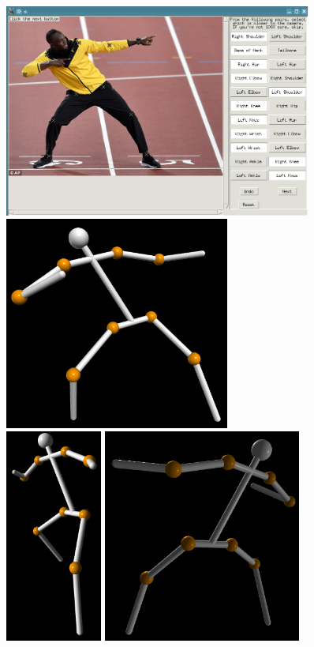 \documentclass[final]{article}
\begin{document}
\begin{spacing}{1.1}
\begin{figure}[h]
  \centering
  \includegraphics[height=7cm]{fig/boltgui.png}
  \includegraphics[height=7cm]{fig/boltrecons.png} \\
  \includegraphics[height=7cm]{fig/boltrecons2.png}
  \includegraphics[height=7cm]{fig/boltrecons3.png}

\end{figure}
\end{spacing}
\end{document}
